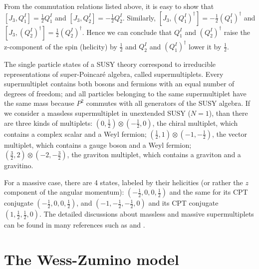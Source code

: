 \documentclass[12pt]{report}
\begin{document}
From the commutation relations listed above, it is easy to show that $[J_{3}, Q^{I}_{1}] = \frac{1}{2} Q^{I}_{1}$ and $[J_{3}, Q^{I}_{2}] = - \frac{1}{2} Q^{I}_{2}$.
Similarly, $[J_{3}, (Q^{I}_{1})^{\dag}] = -\frac{1}{2} (Q^{I}_{1})^{\dag}$ and $[J_{3}, (Q^{I}_{2})^{\dag}] = \frac{1}{2} (Q^{I}_{2})^{\dag}$.
Hence we can conclude that $Q^{I}_{1}$ and $(Q^{I}_{2})^{\dag}$ raise the z-component of the spin (helicity) by $\frac{1}{2}$ and $Q^{I}_{2}$ and $(Q^{I}_{1})^{\dag}$ lower it by $\frac{1}{2}$.

The single particle states of a SUSY theory correspond to irreducible representations of super-Poincar\'{e} algebra, called supermultiplets.
Every supermultiplet contains both bosons and fermions with an equal number of degrees of freedom; and all particles belonging to the same supermultiplet have the same mass because $P^{2}$ commutes with all generators of the SUSY algebra.
If we consider a massless supermultiplet in unextended SUSY ($N = 1$), than there are three kinds of multiplets:
$(0, \frac{1}{2}) \otimes (-\frac{1}{2}, 0)$, the chiral multiplet, which contains a complex scalar and a Weyl fermion;
$(\frac{1}{2}, 1) \otimes (-1, -\frac{1}{2})$, the vector multiplet, which contains a gauge boson and a Weyl fermion;
$(\frac{3}{2}, 2) \otimes (-2, -\frac{3}{2})$, the graviton multiplet, which contains a graviton and a gravitino.

For a massive case, there are 4 states, labeled by their helicities (or rather the $z$ component of the angular momentum): $(-\frac{1}{2}, 0, 0, \frac{1}{2})$ and the same for its CPT conjugate $(-\frac{1}{2}, 0, 0, \frac{1}{2})$, and $(-1, -\frac{1}{2}, -\frac{1}{2}, 0)$ and its CPT conjugate $(1, \frac{1}{2}, \frac{1}{2}, 0)$.
The detailed discussions about massless and massive supermultiplets can be found in many references such as \cite{Bilal} and \cite{larsenf}.





\chapter{The Wess-Zumino model}
\end{document}
